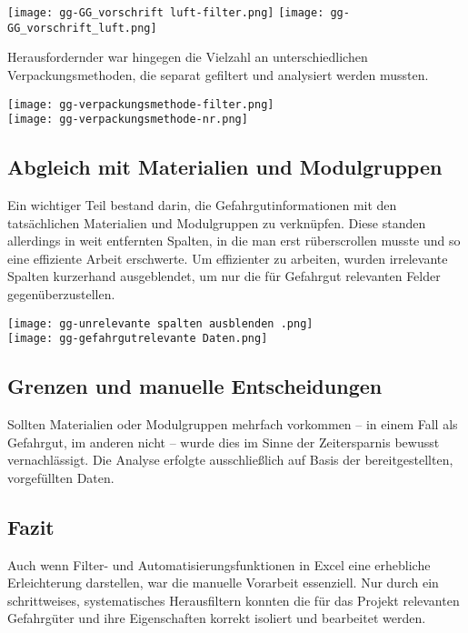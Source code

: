 \begin{center}
  \texttt{[image: gg-GG\_vorschrift luft-filter.png]}
  \texttt{[image: gg-GG\_vorschrift\_luft.png]}
\end{center}


Herausfordernder war hingegen die Vielzahl an unterschiedlichen Verpackungsmethoden, die separat gefiltert und 
analysiert werden mussten.

\begin{center}
\texttt{[image: gg-verpackungsmethode-filter.png]} \\
\texttt{[image: gg-verpackungsmethode-nr.png]}
\end{center}

\subsection{Abgleich mit Materialien und Modulgruppen}
Ein wichtiger Teil bestand darin, die Gefahrgutinformationen mit den tatsächlichen Materialien und Modulgruppen zu
verknüpfen. Diese standen allerdings in weit entfernten Spalten, in die man erst rüberscrollen musste und so eine 
effiziente Arbeit erschwerte. Um effizienter zu arbeiten, wurden irrelevante Spalten kurzerhand ausgeblendet, um nur 
die für Gefahrgut relevanten Felder gegenüberzustellen.

\begin{center}
\texttt{[image: gg-unrelevante spalten ausblenden .png]} \\
\texttt{[image: gg-gefahrgutrelevante Daten.png]}
\end{center}

\subsection{Grenzen und manuelle Entscheidungen}
Sollten Materialien oder Modulgruppen mehrfach vorkommen – in einem Fall als Gefahrgut, im anderen nicht – wurde dies 
im Sinne der Zeitersparnis bewusst vernachlässigt. Die Analyse erfolgte ausschließlich auf Basis der bereitgestellten, 
vorgefüllten Daten.

\subsection{Fazit}
Auch wenn Filter- und Automatisierungsfunktionen in Excel eine erhebliche Erleichterung darstellen, war die manuelle 
Vorarbeit essenziell. Nur durch ein schrittweises, systematisches Herausfiltern konnten die für das Projekt relevanten 
Gefahrgüter und ihre Eigenschaften korrekt isoliert und bearbeitet werden.
